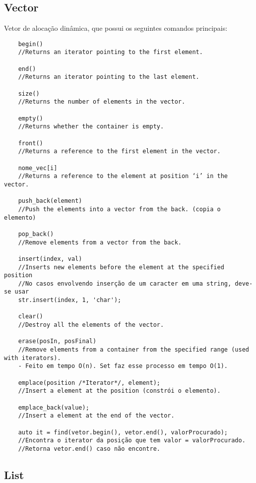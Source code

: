 \subsection{Vector}
Vetor de alocação dinâmica, que possui os seguintes comandos principais:
\begin{verbatim}
    begin()
    //Returns an iterator pointing to the first element.

    end() 
    //Returns an iterator pointing to the last element.

    size() 
    //Returns the number of elements in the vector.

    empty() 
    //Returns whether the container is empty.

    front() 
    //Returns a reference to the first element in the vector.

    nome_vec[i] 
    //Returns a reference to the element at position ‘i’ in the vector.

    push_back(element) 
    //Push the elements into a vector from the back. (copia o elemento)

    pop_back() 
    //Remove elements from a vector from the back.

    insert(index, val) 
    //Inserts new elements before the element at the specified position
    //No casos envolvendo inserção de um caracter em uma string, deve-se usar 
    str.insert(index, 1, 'char');

    clear() 
    //Destroy all the elements of the vector.

    erase(posIn, posFinal) 
    //Remove elements from a container from the specified range (used with iterators).
    - Feito em tempo O(n). Set faz esse processo em tempo O(1).

    emplace(position /*Iterator*/, element); 
    //Insert a element at the position (constrói o elemento).

    emplace_back(value); 
    //Insert a element at the end of the vector.

    auto it = find(vetor.begin(), vetor.end(), valorProcurado);
    //Encontra o iterator da posição que tem valor = valorProcurado.
    //Retorna vetor.end() caso não encontre.
\end{verbatim}

\subsection{List}


